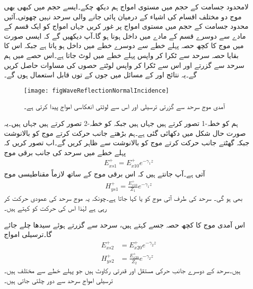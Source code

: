 لامحدود جسامت کے حجم میں مستوی امواج ہم دیکھ چکے۔ایسے حجم میں کبھی بھی موج دو مختلف اقسام کی اشیاء کے درمیان پائی جانے والی سرحد نہیں چھوتی۔آئیں محدود جسامت کے حجم میں مستوی امواج پر غور کریں جہاں امواج کو ایک قسم کے مادے سے دوسرے قسم کے مادے میں داخل ہونا ہو گا۔آپ دیکھیں گے کہ ایسی صورت میں موج کا کچھ حصہ پہلے خطے سے دوسرے خطے میں داخل ہو پاتا ہے جبکہ اس کا بقایا حصہ سرحد سے ٹکرا کر واپس پہلے خطے میں لوٹ جاتا ہے۔اس حصے میں ہم سرحد سے گزرتے اور اس سے ٹکرا کر واپس لوٹتے حصوں کی مساوات حاصل کریں گے۔یہ نتائج   اور   کے مسائل میں جوں کے توں قابل استعمال ہوں گے۔
\begin{figure}
\centering
\texttt{[image: figWaveReflectionNormalIncidence]}
\caption{آمدی موج سرحد سے گزرتی ترسیلی اور اس سے  لوٹتی انعکاسی امواج پیدا کرتی ہے۔}
\label{شکل_موج_آمدی_انعکاسی_ترسیلی}
\end{figure}

ہم  کو خطہ-1 تصور کرتے ہیں جہاں  ہیں جبکہ  کو خطہ-2 تصور کرتے ہیں جہاں  ہیں۔یہ صورت حال شکل  میں دکھائی گئی ہے۔ہم بڑھتے  جانب حرکت کرتے موج کو بالانوشت  جبکہ گھٹتے  جانب حرکت کرتے موج کو بالانوشت  سے ظاہر کریں گے۔اب تصور کریں کہ پہلے خطے میں سرحد کی جانب برقی موج
\begin{align}\label{مساوات_موج_برقی_الف_آمد}
E_{xs1}^+=E_{x10}^+e^{-\gamma_1 z}
\end{align}
آتی ہے۔آپ جانتے ہیں کہ اس برقی موج کے ساتھ لازماً مقناطیسی موج
\begin{align}
H_{ys1}^+=\frac{E_{x10}^+}{Z_1} e^{-\gamma_1 z}\label{مساوات_موج_مقناطیسی_الف_آمد}
\end{align}
بھی ہو گی۔ سرحد کی طرف آتی موج کو  یا  کہا جاتا ہے۔چونکہ یہ موج سرحد کی عمودی حرکت کر رہی ہے لہٰذا اس کی حرکت کو  کہتے ہیں۔

اس آمدی موج کا کچھ حصہ جسے  کہتے ہیں، سرحد سے گزرتے ہوئے  سیدھا چلے جائے گا۔ترسیلی امواج
\begin{align}
E_{xs2}^+&=E_{x20}^+e^{-\gamma_2 z}\label{مساوات_موج_برقی_ب_ترسیلی}\\
H_{ys2}^+&=\frac{E_{x20}^+}{Z_2} e^{-\gamma_2 z}\label{مساوات_موج_مقناطیسی_ب_ترسیلی}
\end{align}
ہیں۔سرحد کے دوسرے جانب حرکی مستقل  اور قدرتی رکاوٹ  ہیں جو پہلے خطے سے مختلف ہیں۔ترسیلی امواج سرحد سے دور چلتی جاتی ہیں۔

